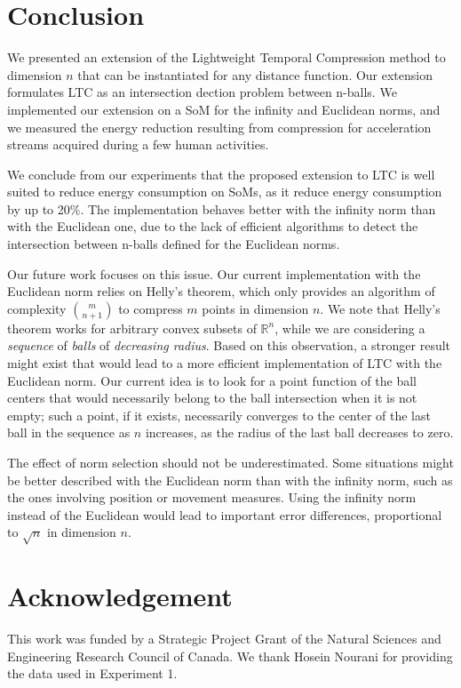 \documentclass[10pt, conference, compsocconf]{IEEEtran}
\begin{document}


\section{Conclusion}

We presented an extension of the Lightweight Temporal Compression 
method to dimension $n$ that can be instantiated for any distance 
function. Our extension formulates LTC as an intersection dection 
problem between n-balls. We implemented our extension on a SoM for the 
infinity and Euclidean norms, and we measured the energy reduction 
resulting from compression for acceleration streams acquired during a 
few human activities.

We conclude from our experiments that the proposed extension to LTC is 
well suited to reduce energy consumption on SoMs, as it reduce energy 
consumption by up to 20\%. The implementation behaves better with the 
infinity norm than with the Euclidean one, due to the lack of efficient 
algorithms to detect the intersection between n-balls defined for the 
Euclidean norms.

Our future work focuses on this issue. Our current implementation with 
the Euclidean norm relies on Helly's theorem, which only provides an 
algorithm of complexity ${m \choose n+1}$ to compress $m$ points in 
dimension $n$. We note that Helly's theorem works for arbitrary convex 
subsets of $\mathbb{R}^n$, while we are considering a \emph{sequence} 
of \emph{balls} of \emph{decreasing radius}. Based on this 
observation, a stronger result might exist that would lead to a more 
efficient implementation of LTC with the Euclidean norm. Our current 
idea is to look for a point function of the ball centers that would 
necessarily belong to the ball intersection when it is not empty; such 
a point, if it exists, necessarily converges to the center of the last 
ball in the sequence as $n$ increases, as the radius of the last ball
decreases to zero.

The effect of norm selection should not be underestimated. Some 
situations might be better described with the Euclidean norm than with the
infinity norm, such as the ones involving position or movement measures. 
Using the infinity norm instead of the Euclidean would lead to important 
error differences, proportional to $\sqrt{n}$ in dimension $n$. 

\section*{Acknowledgement}
This work was funded by a Strategic Project Grant of the Natural 
Sciences and Engineering Research Council of Canada. We thank Hosein 
Nourani for providing the data used in Experiment 1.



\end{document}
